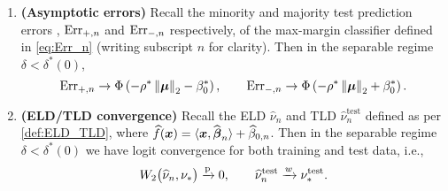 \begin{thm}
\begin{enumerate}[label=(\alph*)]
        \item \label{thm:SVM_main_err}
        \textbf{(Asymptotic errors)} Recall the minority and majority test prediction errors , $\mathrm{Err}_{+,n}$ and $\mathrm{Err}_{-,n}$ respectively, of the max-margin classifier defined in \cref{eq:Err_n} (writing subscript $n$ for clarity). %
        Then in the separable regime $\delta < \delta^*(0)$,
        \begin{equation*}
            \mathrm{Err}_{+,n}  \to  \Phi \left(- \rho^* \left\|{\text{\boldmath $\mu$}}\right\|_2 - \beta_0^* \right),
            \qquad
            \mathrm{Err}_{-,n}  \to  \Phi \left(- \rho^* \left\|{\text{\boldmath $\mu$}}\right\|_2  + \beta_0^* \right).
        \end{equation*}
        \item \label{thm:SVM_main_logit}
        \textbf{(ELD/TLD convergence)} 
        Recall the ELD $\hat\nu_n$ and TLD $\hat\nu_n^\mathrm{test}$ defined as per \cref{def:ELD_TLD}, where $\widehat f(\text{\boldmath $x$}) = \langle \text{\boldmath $x$}, \widehat{{\boldsymbol{\beta}}}_n \rangle + \widehat\beta_{0, n}$.
        Then in the separable regime $\delta < \delta^*(0)$ we have logit convergence for both training and test data, i.e.,
        \begin{equation*}
            W_2\bigl(\widehat{\nu}_n , \nu_* \bigr) \xrightarrow{\mathrm{p}} 0,
            \qquad
            \widehat{\nu}_n^\mathrm{test} \xrightarrow{w} \nu^\mathrm{test}_*.
        \end{equation*}
    \end{enumerate}
\end{thm}

